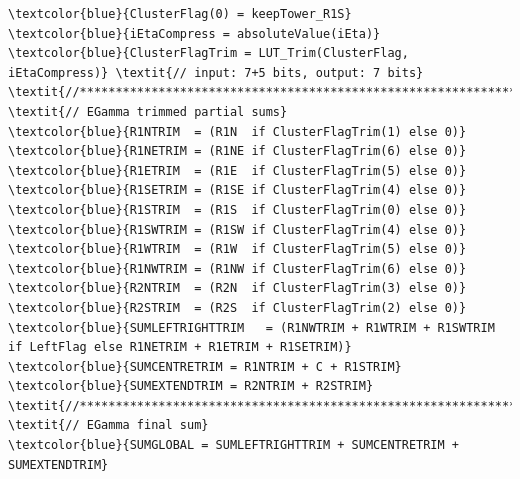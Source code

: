 \documentclass[a4paper, 12pt]{article}
\begin{document}
\begin{Verbatim}[label={Cluster trigger former}]
\textcolor{blue}{ClusterFlag(0) = keepTower_R1S}
\textcolor{blue}{iEtaCompress = absoluteValue(iEta)}
\textcolor{blue}{ClusterFlagTrim = LUT_Trim(ClusterFlag, iEtaCompress)} \textit{// input: 7+5 bits, output: 7 bits}
\textit{//******************************************************************//}
\textit{// EGamma trimmed partial sums}
\textcolor{blue}{R1NTRIM  = (R1N  if ClusterFlagTrim(1) else 0)}
\textcolor{blue}{R1NETRIM = (R1NE if ClusterFlagTrim(6) else 0)}
\textcolor{blue}{R1ETRIM  = (R1E  if ClusterFlagTrim(5) else 0)}
\textcolor{blue}{R1SETRIM = (R1SE if ClusterFlagTrim(4) else 0)}
\textcolor{blue}{R1STRIM  = (R1S  if ClusterFlagTrim(0) else 0)}
\textcolor{blue}{R1SWTRIM = (R1SW if ClusterFlagTrim(4) else 0)}
\textcolor{blue}{R1WTRIM  = (R1W  if ClusterFlagTrim(5) else 0)}
\textcolor{blue}{R1NWTRIM = (R1NW if ClusterFlagTrim(6) else 0)}
\textcolor{blue}{R2NTRIM  = (R2N  if ClusterFlagTrim(3) else 0)}
\textcolor{blue}{R2STRIM  = (R2S  if ClusterFlagTrim(2) else 0)}
\textcolor{blue}{SUMLEFTRIGHTTRIM   = (R1NWTRIM + R1WTRIM + R1SWTRIM if LeftFlag else R1NETRIM + R1ETRIM + R1SETRIM)}
\textcolor{blue}{SUMCENTRETRIM = R1NTRIM + C + R1STRIM}
\textcolor{blue}{SUMEXTENDTRIM = R2NTRIM + R2STRIM}
\textit{//******************************************************************//}
\textit{// EGamma final sum}
\textcolor{blue}{SUMGLOBAL = SUMLEFTRIGHTTRIM + SUMCENTRETRIM + SUMEXTENDTRIM}
\end{Verbatim}

%
\end{document}
